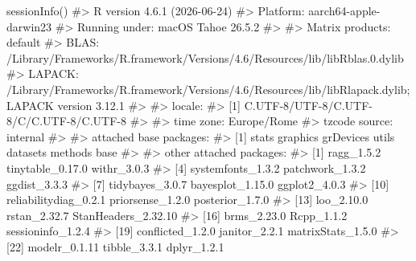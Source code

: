 \documentclass[
  italian,
  letterpaper,
  a4paper,
  11pt,
  open=any]{scrbook}
\newenvironment{Shaded}{\begin{snugshade}}{\end{snugshade}}
\newcommand{\CommentTok}[1]{\textcolor[rgb]{0.37,0.37,0.37}{#1}}
\newcommand{\FunctionTok}[1]{\textcolor[rgb]{0.28,0.35,0.67}{#1}}
\newcommand{\NormalTok}[1]{\textcolor[rgb]{0.00,0.23,0.31}{#1}}
\theoremstyle{plain}
\theoremstyle{definition}
\theoremstyle{definition}
\theoremstyle{remark}
\begin{document}
\begin{tcolorbox}[enhanced jigsaw, arc=.35mm, bottomrule=.15mm, bottomtitle=1mm, breakable, colback=white, colbacktitle=quarto-callout-note-color!10!white, colframe=quarto-callout-note-color-frame, coltitle=black, left=2mm, leftrule=.75mm, opacityback=0, opacitybacktitle=0.6, rightrule=.15mm, title=\textcolor{quarto-callout-note-color}{\faInfo}\hspace{0.5em}{Informazioni sull'ambiente di sviluppo}, titlerule=0mm, toprule=.15mm, toptitle=1mm]

\begin{Shaded}
\begin{Highlighting}[]
\FunctionTok{sessionInfo}\NormalTok{()}
\CommentTok{\#\textgreater{} R version 4.6.1 (2026{-}06{-}24)}
\CommentTok{\#\textgreater{} Platform: aarch64{-}apple{-}darwin23}
\CommentTok{\#\textgreater{} Running under: macOS Tahoe 26.5.2}
\CommentTok{\#\textgreater{} }
\CommentTok{\#\textgreater{} Matrix products: default}
\CommentTok{\#\textgreater{} BLAS:   /Library/Frameworks/R.framework/Versions/4.6/Resources/lib/libRblas.0.dylib }
\CommentTok{\#\textgreater{} LAPACK: /Library/Frameworks/R.framework/Versions/4.6/Resources/lib/libRlapack.dylib;  LAPACK version 3.12.1}
\CommentTok{\#\textgreater{} }
\CommentTok{\#\textgreater{} locale:}
\CommentTok{\#\textgreater{} [1] C.UTF{-}8/UTF{-}8/C.UTF{-}8/C/C.UTF{-}8/C.UTF{-}8}
\CommentTok{\#\textgreater{} }
\CommentTok{\#\textgreater{} time zone: Europe/Rome}
\CommentTok{\#\textgreater{} tzcode source: internal}
\CommentTok{\#\textgreater{} }
\CommentTok{\#\textgreater{} attached base packages:}
\CommentTok{\#\textgreater{} [1] stats     graphics  grDevices utils     datasets  methods   base     }
\CommentTok{\#\textgreater{} }
\CommentTok{\#\textgreater{} other attached packages:}
\CommentTok{\#\textgreater{}  [1] ragg\_1.5.2            tinytable\_0.17.0      withr\_3.0.3          }
\CommentTok{\#\textgreater{}  [4] systemfonts\_1.3.2     patchwork\_1.3.2       ggdist\_3.3.3         }
\CommentTok{\#\textgreater{}  [7] tidybayes\_3.0.7       bayesplot\_1.15.0      ggplot2\_4.0.3        }
\CommentTok{\#\textgreater{} [10] reliabilitydiag\_0.2.1 priorsense\_1.2.0      posterior\_1.7.0      }
\CommentTok{\#\textgreater{} [13] loo\_2.10.0            rstan\_2.32.7          StanHeaders\_2.32.10  }
\CommentTok{\#\textgreater{} [16] brms\_2.23.0           Rcpp\_1.1.2            sessioninfo\_1.2.4    }
\CommentTok{\#\textgreater{} [19] conflicted\_1.2.0      janitor\_2.2.1         matrixStats\_1.5.0    }
\CommentTok{\#\textgreater{} [22] modelr\_0.1.11         tibble\_3.3.1          dplyr\_1.2.1          }

\end{Highlighting}
\end{Shaded}
\end{tcolorbox}
\end{document}

